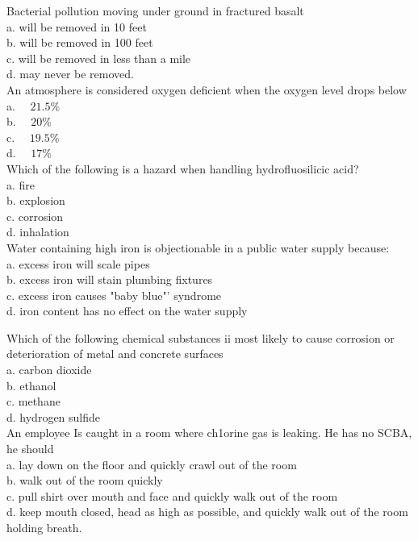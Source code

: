 Bacterial pollution moving under ground in fractured basalt\\
a. will be removed in 10 feet\\
b. will be removed in 100 feet\\
c. will be removed in less than a mile\\
d. may never be removed.\\

An atmosphere is considered oxygen deficient when the oxygen level drops below\\
a. $\quad 21.5 \%$\\
b. $\quad 20 \%$\\
c. $\quad 19.5 \%$\\
d. $\quad 17 \%$\\

Which of the following is a hazard when handling hydrofluosilicic acid?\\
a. fire\\
b. explosion\\
c. corrosion\\
d. inhalation\\

Water containing high iron is objectionable in a public water supply because:\\
a. excess iron will scale pipes\\
b. excess iron will stain plumbing fixtures\\
c. excess iron causes "baby blue"' syndrome\\
d. iron content has no effect on the water supply 

Which of the following chemical substances ii most likely to cause corrosion or deterioration of metal and concrete surfaces\\
a. carbon dioxide\\
b. ethanol\\
c. methane\\
d. hydrogen sulfide\\

An employee Is caught in a room where ch1orine gas is leaking. He has no SCBA, he should\\
a. lay down on the floor and quickly crawl out of the room\\
b. walk out of the room quickly\\
c. pull shirt over mouth and face and quickly walk out of the room\\
d. keep mouth closed, head as high as possible, and quickly walk out of the room holding breath.\\

